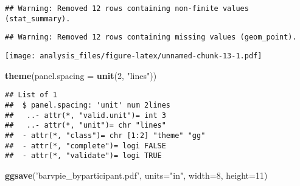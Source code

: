 \documentclass[]{article}
\newenvironment{Shaded}{\begin{snugshade}}{\end{snugshade}}
\newcommand{\KeywordTok}[1]{\textcolor[rgb]{0.13,0.29,0.53}{\textbf{{#1}}}}
\newcommand{\DataTypeTok}[1]{\textcolor[rgb]{0.13,0.29,0.53}{{#1}}}
\newcommand{\DecValTok}[1]{\textcolor[rgb]{0.00,0.00,0.81}{{#1}}}
\newcommand{\FloatTok}[1]{\textcolor[rgb]{0.00,0.00,0.81}{{#1}}}
\newcommand{\StringTok}[1]{\textcolor[rgb]{0.31,0.60,0.02}{{#1}}}
\newcommand{\NormalTok}[1]{{#1}}
\begin{document}
\begin{Shaded}
\end{Shaded}

\begin{verbatim}
## Warning: Removed 12 rows containing non-finite values (stat_summary).
\end{verbatim}

\begin{verbatim}
## Warning: Removed 12 rows containing missing values (geom_point).
\end{verbatim}

\texttt{[image: analysis\_files/figure-latex/unnamed-chunk-13-1.pdf]}

\begin{Shaded}
\begin{Highlighting}[]
   \KeywordTok{theme}\NormalTok{(}\DataTypeTok{panel.spacing =} \KeywordTok{unit}\NormalTok{(}\DecValTok{2}\NormalTok{, }\StringTok{"lines"}\NormalTok{))}
\end{Highlighting}
\end{Shaded}

\begin{verbatim}
## List of 1
##  $ panel.spacing: 'unit' num 2lines
##   ..- attr(*, "valid.unit")= int 3
##   ..- attr(*, "unit")= chr "lines"
##  - attr(*, "class")= chr [1:2] "theme" "gg"
##  - attr(*, "complete")= logi FALSE
##  - attr(*, "validate")= logi TRUE
\end{verbatim}

\begin{Shaded}
\begin{Highlighting}[]
\KeywordTok{ggsave}\NormalTok{(}\StringTok{'barvpie_byparticipant.pdf'}\NormalTok{, }\DataTypeTok{units=}\StringTok{"in"}\NormalTok{, }\DataTypeTok{width=}\DecValTok{8}\NormalTok{, }\DataTypeTok{height=}\DecValTok{11}\NormalTok{)}
\end{Highlighting}
\end{Shaded}
\end{document}
